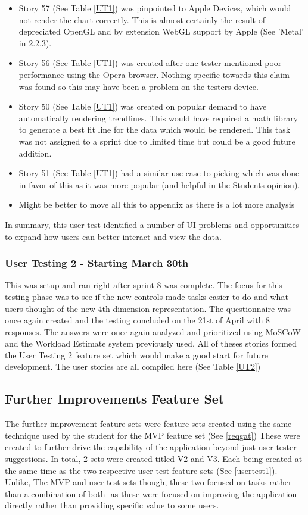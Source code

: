 \begin{itemize}
    \item Story 57 (See Table \ref{UT1}) was pinpointed to Apple Devices, which would not render the chart correctly. This is almost certainly the result of depreciated OpenGL and by extension WebGL support by Apple (See 'Metal' in 2.2.3).
    \item Story 56 (See Table \ref{UT1}) was created after one tester mentioned poor performance using the Opera browser. Nothing specific towards this claim was found so this may have been a problem on the testers device.
    \item Story 50 (See Table \ref{UT1}) was created on popular demand to have automatically rendering trendlines. This would have required a math library to generate a best fit line for the data which would be rendered. This task was not assigned to a sprint due to limited time but could be a good future addition.
    \item Story 51 (See Table \ref{UT1}) had a similar use case to picking which was done in favor of this as it was more popular (and helpful in the Students opinion).
    \item Might be better to move all this to appendix as there is a lot more analysis
\end{itemize}

In summary, this user test identified a number of UI problems and opportunities to expand how users can better interact and view the data.

\subsubsection{User Testing 2 - Starting March 30th}
This was setup and ran right after sprint 8 was complete. The focus for this testing phase was to see if the new controls made tasks easier to do and what users thought of the new 4th dimension representation. The questionnaire was once again created and the testing concluded on the 21st of April with 8 responses. The answers were once again analyzed and prioritized using MoSCoW and the Workload Estimate system previously used. All of theses stories formed the User Testing 2 feature set which would make a good start for future development.
The user stories are all compiled here (See Table \ref{UT2})

\subsection{Further Improvements Feature Set}
The further improvement feature sets were feature sets created using the same technique used by the student for the MVP feature set (See \ref{reqgat}) These were created to further drive the capability of the application beyond just user tester suggestions. In total, 2 sets were created titled V2 and V3. Each being created at the same time as the two respective user test feature sets (See \ref{usertest1}). Unlike, The MVP and user test sets though, these two focused on tasks rather than a combination of both- as these were focused on improving the application directly rather than providing specific value to some users.

